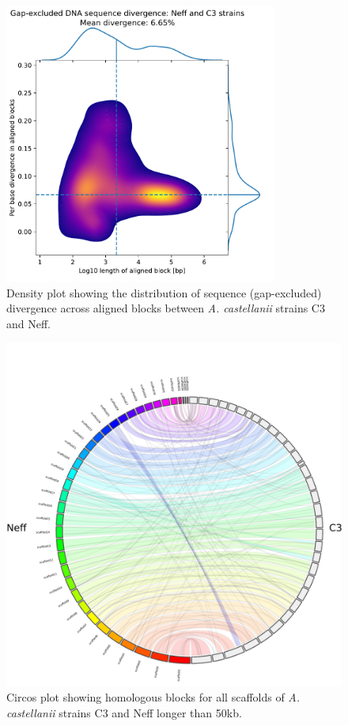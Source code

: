 \begin{figure}[htb]
    \center
    \includegraphics[width=0.8\textwidth]{Parts/Part02/gfx/acas_strains_div.pdf}
    \caption[Sequence divergence between \textit{A. castellanii} strains C3 and Neff.]{Density plot showing the distribution of sequence (gap-excluded) divergence across aligned blocks between \textit{A. castellanii} strains C3 and Neff.}
    \label{fig:02-02:acas-div}
\end{figure}

\begin{figure}[htb]
    \includegraphics[width=\textwidth]{Parts/Part02/gfx/acas_circos.pdf}
    \caption[Circos plot of \textit{A. castellanii} strains C3 and Neff.]{Circos plot showing homologous blocks for all scaffolds of \textit{A. castellanii} strains C3 and Neff longer than 50kb.}
    \label{fig:02-02:acas-circos}
\end{figure}
